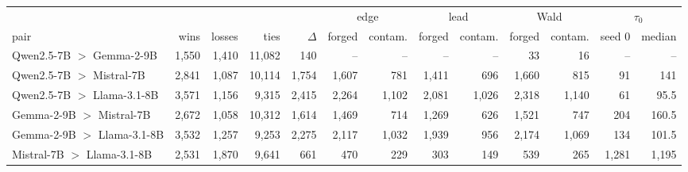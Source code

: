 \begin{tabular}{lrrrrrrrrrrrr}
\toprule
 & & & & & \multicolumn{2}{c}{edge} & \multicolumn{2}{c}{lead} & \multicolumn{2}{c}{Wald} & \multicolumn{2}{c}{$\tau_0$} \\
\cmidrule(lr){6-7}\cmidrule(lr){8-9}\cmidrule(lr){10-11}\cmidrule(lr){12-13}
pair & wins & losses & ties & $\Delta$ & forged & contam. & forged & contam. & forged & contam. & seed 0 & median \\
\midrule
Qwen2.5-7B $>$ Gemma-2-9B & 1,550 & 1,410 & 11,082 & 140 & -- & -- & -- & -- & 33 & 16 & -- & -- \\
Qwen2.5-7B $>$ Mistral-7B & 2,841 & 1,087 & 10,114 & 1,754 & 1,607 & 781 & 1,411 & 696 & 1,660 & 815 & 91 & 141 \\
Qwen2.5-7B $>$ Llama-3.1-8B & 3,571 & 1,156 & 9,315 & 2,415 & 2,264 & 1,102 & 2,081 & 1,026 & 2,318 & 1,140 & 61 & 95.5 \\
Gemma-2-9B $>$ Mistral-7B & 2,672 & 1,058 & 10,312 & 1,614 & 1,469 & 714 & 1,269 & 626 & 1,521 & 747 & 204 & 160.5 \\
Gemma-2-9B $>$ Llama-3.1-8B & 3,532 & 1,257 & 9,253 & 2,275 & 2,117 & 1,032 & 1,939 & 956 & 2,174 & 1,069 & 134 & 101.5 \\
Mistral-7B $>$ Llama-3.1-8B & 2,531 & 1,870 & 9,641 & 661 & 470 & 229 & 303 & 149 & 539 & 265 & 1,281 & 1,195 \\
\bottomrule
\end{tabular}